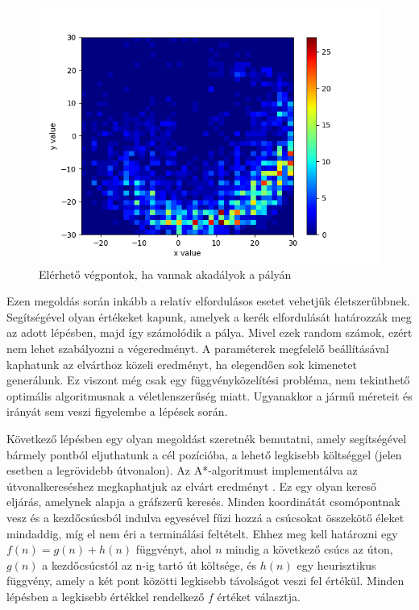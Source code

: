 \begin{figure}[h!]
\centering
\includegraphics[scale=0.75]{images/obstacles_histogram2d.png}
\caption{Elérhető végpontok, ha vannak akadályok a pályán}
\label{fig:obstacles_histogram2d}
\end{figure}

\newpage


Ezen megoldás során inkább a relatív elfordulásos esetet vehetjük életszerűbbnek. Segítségével olyan értékeket kapunk, amelyek a kerék elfordulását határozzák meg az adott lépésben, majd így számolódik a pálya. Mivel ezek random számok, ezért nem lehet szabályozni a végeredményt. A paraméterek megfelelő beállításával kaphatunk az elvárthoz közeli eredményt, ha elegendően sok kimenetet generálunk. Ez viszont még csak egy függvényközelítési probléma, nem tekinthető optimális algoritmusnak a véletlenszerűség miatt. Ugyanakkor a jármű méreteit és irányát sem veszi figyelembe a lépések során.


Következő lépésben egy olyan megoldást szeretnék bemutatni, amely segítségével bármely pontból eljuthatunk a cél pozícióba, a lehető legkisebb költséggel (jelen esetben a legrövidebb útvonalon).
Az A*-algoritmust implementálva az útvonalkereséshez megkaphatjuk az elvárt eredményt \cite{A_star}. Ez egy olyan kereső eljárás, amelynek alapja a gráfszerű keresés. Minden koordinátát csomópontnak vesz és a kezdőcsúcsból indulva egyesével fűzi hozzá a csúcsokat összekötő éleket mindaddig, míg el nem éri a terminálási feltételt. Ehhez meg kell határozni egy $ f(n) = g(n) + h(n) $ függvényt, ahol $ n $ mindig a következő csúcs az úton, $ g(n) $ a kezdőcsúcstól az n-ig tartó út költsége, és $ h(n) $ egy heurisztikus függvény, amely a két pont közötti legkisebb távolságot veszi fel értékül. Minden lépésben a legkisebb értékkel rendelkező $ f $ értéket választja.

